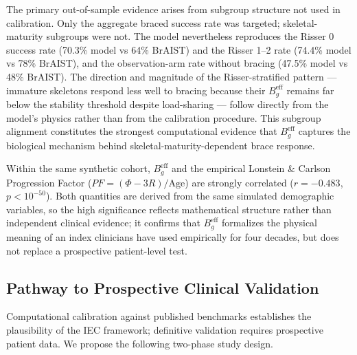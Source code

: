 The primary out-of-sample evidence arises from subgroup structure not used in calibration. Only the aggregate braced success rate was targeted; skeletal-maturity subgroups were not. The model nevertheless reproduces the Risser 0 success rate (70.3\% model vs 64\% BrAIST) and the Risser 1--2 rate (74.4\% model vs 78\% BrAIST), and the observation-arm rate without bracing (47.5\% model vs 48\% BrAIST). The direction and magnitude of the Risser-stratified pattern --- immature skeletons respond less well to bracing because their $B_g^{\mathrm{eff}}$ remains far below the stability threshold despite load-sharing --- follow directly from the model's physics rather than from the calibration procedure. This subgroup alignment constitutes the strongest computational evidence that $B_g^{\mathrm{eff}}$ captures the biological mechanism behind skeletal-maturity-dependent brace response.

Within the same synthetic cohort, $B_g^{\mathrm{eff}}$ and the empirical Lonstein \& Carlson Progression Factor ($PF = (\Phi - 3R)/\mathrm{Age}$) are strongly correlated ($r = -0.483$, $p < 10^{-50}$). Both quantities are derived from the same simulated demographic variables, so the high significance reflects mathematical structure rather than independent clinical evidence; it confirms that $B_g^{\mathrm{eff}}$ formalizes the physical meaning of an index clinicians have used empirically for four decades, but does not replace a prospective patient-level test.

\subsection{Pathway to Prospective Clinical Validation}
\label{sec:prospective}

Computational calibration against published benchmarks establishes the plausibility of the IEC framework; definitive validation requires prospective patient data. We propose the following two-phase study design.

